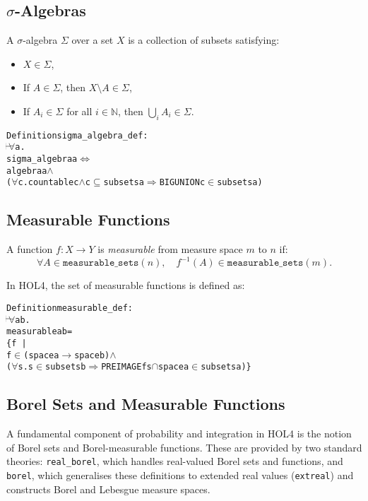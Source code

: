 \subsection{$\sigma$-Algebras}

A $\sigma$-algebra $ \Sigma $ over a set $ X $ is a collection of subsets satisfying:
\begin{itemize}
  \item $ X \in \Sigma $,
  \item If $ A \in \Sigma $, then $ X \setminus A \in \Sigma $,
  \item If $ A_i \in \Sigma $ for all $ i \in \mathbb{N} $, then $ \bigcup_i A_i \in \Sigma $.
\end{itemize}

\begin{hol}
  \begin{alltt}
    Definition sigma\_algebra\_def :
    \(\!\!\!{\turn}\!\!\!\!\) \(\forall\)a.
    sigma\_algebra a \(\Leftrightarrow\)
    algebra a \(\land\)
    (\(\forall\)c. countable c \(\land\) c \(\subseteq\) subsets a \(\Rightarrow\) BIGUNION c \(\in\) subsets a)
  \end{alltt}
\end{hol}


\subsection{Measurable Functions}

A function $ f : X \to Y $ is \emph{measurable} from measure space $ m $ to $ n $ if:
\[
  \forall A \in \texttt{measurable\_sets}(n),\quad f^{-1}(A) \in \texttt{measurable\_sets}(m).
\]

In HOL4, the set of measurable functions is defined as:
\begin{hol}
  \begin{alltt}
    Definition measurable\_def :
    \(\!\!\!{\turn}\!\!\!\!\) \(\forall\)a b.
    measurable a b =
    \{f \,|\,
    f \(\in\) (space a \(\rightarrow\) space b) \(\land\)
    (\(\forall\)s. s \(\in\) subsets b \(\Rightarrow\) PREIMAGE f s \(\cap\) space a \(\in\) subsets a)\}
  \end{alltt}
\end{hol}


\subsection{Borel Sets and Measurable Functions}

A fundamental component of probability and integration in HOL4 is the notion of Borel sets and Borel-measurable functions. These are provided by two standard theories: \texttt{real\_borel}, which handles real-valued Borel sets and functions, and \texttt{borel}, which generalises these definitions to extended real values (\texttt{extreal}) and constructs Borel and Lebesgue measure spaces.

